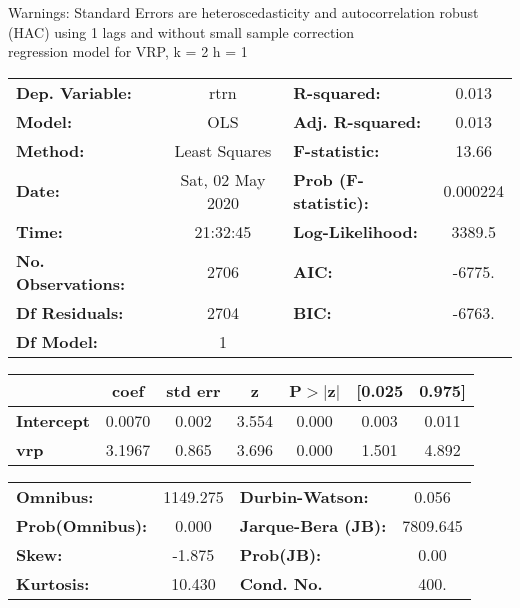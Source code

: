 Warnings: \newline
 [1] Standard Errors are heteroscedasticity and autocorrelation robust (HAC) using 1 lags and without small sample correction\\ 

regression model for VRP, k = 2 h = 1\begin{center}
\begin{tabular}{lclc}
\toprule
\textbf{Dep. Variable:}    &       rtrn       & \textbf{  R-squared:         } &     0.013   \\
\textbf{Model:}            &       OLS        & \textbf{  Adj. R-squared:    } &     0.013   \\
\textbf{Method:}           &  Least Squares   & \textbf{  F-statistic:       } &     13.66   \\
\textbf{Date:}             & Sat, 02 May 2020 & \textbf{  Prob (F-statistic):} &  0.000224   \\
\textbf{Time:}             &     21:32:45     & \textbf{  Log-Likelihood:    } &    3389.5   \\
\textbf{No. Observations:} &        2706      & \textbf{  AIC:               } &    -6775.   \\
\textbf{Df Residuals:}     &        2704      & \textbf{  BIC:               } &    -6763.   \\
\textbf{Df Model:}         &           1      & \textbf{                     } &             \\
\bottomrule
\end{tabular}
\begin{tabular}{lcccccc}
                   & \textbf{coef} & \textbf{std err} & \textbf{z} & \textbf{P$> |$z$|$} & \textbf{[0.025} & \textbf{0.975]}  \\
\midrule
\textbf{Intercept} &       0.0070  &        0.002     &     3.554  &         0.000        &        0.003    &        0.011     \\
\textbf{vrp}       &       3.1967  &        0.865     &     3.696  &         0.000        &        1.501    &        4.892     \\
\bottomrule
\end{tabular}
\begin{tabular}{lclc}
\textbf{Omnibus:}       & 1149.275 & \textbf{  Durbin-Watson:     } &    0.056  \\
\textbf{Prob(Omnibus):} &   0.000  & \textbf{  Jarque-Bera (JB):  } & 7809.645  \\
\textbf{Skew:}          &  -1.875  & \textbf{  Prob(JB):          } &     0.00  \\
\textbf{Kurtosis:}      &  10.430  & \textbf{  Cond. No.          } &     400.  \\
\bottomrule
\end{tabular}
\end{center}

